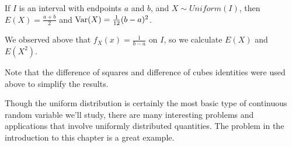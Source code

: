 \par
\begin{prop}\label{UniformVariance}If $I$ is an interval with endpoints $a$ and $b$, and $X \sim Uniform(I)$, then $E(X) = \frac{a+b}{2}$ and $\operatorname{Var}(X) = \frac{1}{12}(b-a)^2$. 
\end{prop}
\begin{pf} We observed above that $f_X(x) = \frac{1}{b-a}$ on $I$, so we calculate $E(X)$ and $E(X^2)$.
\par
\noindent Note that the difference of squares and difference of cubes identities were used above to simplify the results.
\end{pf}
\par Though the uniform distribution is certainly the most basic type of continuous random variable we'll study, there are many interesting problems and applications that involve uniformly distributed quantities. The problem in the introduction to this chapter is a great example.

